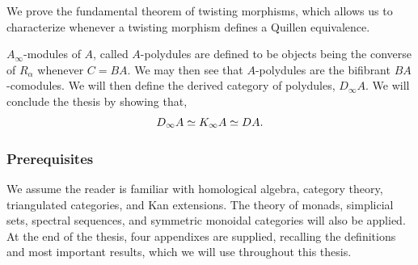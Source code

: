 \documentclass[../thesis.tex]{subfiles}
\begin{document}
            \begin{center}
            \end{center}

            We prove the fundamental theorem of twisting morphisms, which allows us to characterize whenever a twisting morphism defines a Quillen equivalence.

            $A_\infty$-modules of $A$, called $A$-polydules are defined to be objects being the converse of $R_\alpha$ whenever $C = BA$. We may then see that $A$-polydules are the bifibrant $BA$-comodules. We will then define the derived category of polydules, $D_\infty A$. We will conclude the thesis by showing that,
            \begin{align*}
                D_\infty A \simeq K_\infty A \simeq DA\tt{.}
            \end{align*}

        \subsubsection*{Prerequisites}
            We assume the reader is familiar with homological algebra, category theory, triangulated categories, and Kan extensions. The theory of monads, simplicial sets, spectral sequences, and symmetric monoidal categories will also be applied. At the end of the thesis, four appendixes are supplied, recalling the definitions and most important results, which we will use throughout this thesis.
\end{document}
